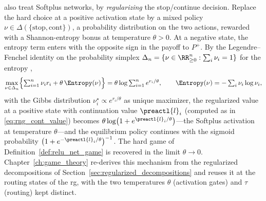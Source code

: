 \begin{remark}\label{rem:softplus_game}
\textcite{Gaubert2025} also treat Softplus networks, by \emph{regularizing} the stop/continue decision. Replace the hard choice at a positive activation state by a mixed policy $\nu \in \Delta(\{\mathrm{stop}, \mathrm{cont}\})$, a probability distribution on the two actions, rewarded with a Shannon-entropy bonus at temperature $\theta > 0$. At a negative state, the entropy term enters with the opposite sign in the payoff to $P^+$. By the Legendre--Fenchel identity on the probability simplex $\Delta_n=\{\nu\in\RR^n_{\ge0}:\sum_i\nu_i=1\}$ for the entropy \parencite{BoydVandenberghe2004},
\begin{equation}
	\max_{\nu \in \Delta_n} \Bigl\{ \textstyle\sum_{i=1}^{n} \nu_i r_i + \theta\, \Entropy(\nu) \Bigr\}
	= \theta \log \textstyle\sum_{i=1}^{n} e^{r_i / \theta},
	\qquad
	\Entropy(\nu) = -\textstyle\sum_i \nu_i \log \nu_i,
	\label{eq:legendre_fenchel}
\end{equation}
with the Gibbs distribution $\nu^{\star}_i \propto e^{r_i/\theta}$ as unique maximizer, the regularized value at a positive state with continuation value $\preactl{l}_i$ (computed as in \eqref{eq:rng_cont_value}) becomes $\theta \log\bigl(1 + e^{\preactl{l}_i / \theta}\bigr)$---the Softplus activation at temperature $\theta$---and the equilibrium policy continues with the sigmoid probability $\bigl(1 + e^{-\preactl{l}_i/\theta}\bigr)^{-1}$. The hard game of Definition~\ref{def:relu_net_game} is recovered in the limit $\theta \to 0$. Chapter~\ref{ch:game_theory} re-derives this mechanism from the regularized decompositions of Section~\ref{sec:regularized_decompositions} and reuses it at the routing states of the \ac{rg}, with the two temperatures $\theta$ (activation gates) and $\tau$ (routing) kept distinct.
\end{remark}

